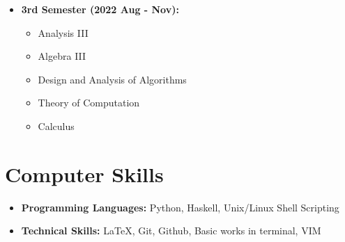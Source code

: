 \documentclass[10pt,a4paper,sans]{moderncv}        %
\begin{document}
	
	\begin{itemize}

		\item \textbf{3rd Semester (2022 Aug - Nov):} \begin{itemize}
			\item Analysis III
			\item Algebra III
			\item Design and Analysis of Algorithms
			\item Theory of Computation
			\item Calculus
		\end{itemize}
		
	\end{itemize}
	

	
	\section{Computer Skills}
	
	\begin{itemize}
		
		\item \textbf{Programming Languages:} Python, Haskell, Unix/Linux Shell Scripting
		
		\item \textbf{Technical Skills:} \LaTeX, Git, Github, Basic works in terminal, VIM
		
		
	\end{itemize}
\end{document}
